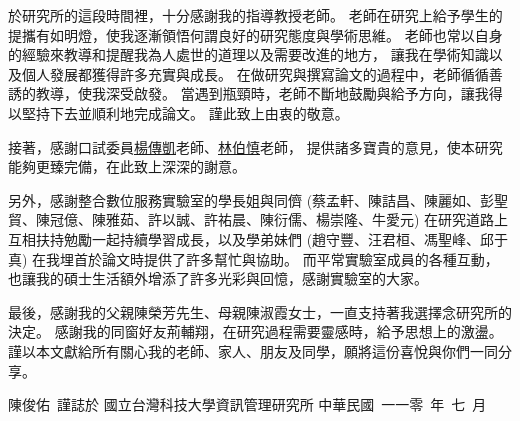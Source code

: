 
\begin{acknowledgement}

    於研究所的這段時間裡，十分感謝我的指導教授\underline{\advisor}老師。
老師在研究上給予學生的提攜有如明燈，使我逐漸領悟何謂良好的研究態度與學術思維。
老師也常以自身的經驗來教導和提醒我為人處世的道理以及需要改進的地方，
讓我在學術知識以及個人發展都獲得許多充實與成長。
在做研究與撰寫論文的過程中，老師循循善誘的教導，使我深受啟發。
當遇到瓶頸時，老師不斷地鼓勵與給予方向，讓我得以堅持下去並順利地完成論文。
謹此致上由衷的敬意。

    接著，感謝口試委員\underline{楊傳凱}老師、\underline{林伯慎}老師，
提供諸多寶貴的意見，使本研究能夠更臻完備，在此致上深深的謝意。

    另外，感謝整合數位服務實驗室的學長姐與同儕
(蔡孟軒、陳詰昌、陳麗如、彭聖貿、陳冠億、陳雅茹、許以誠、許祐晨、陳衍儒、楊崇隆、牛愛元)
在研究道路上互相扶持勉勵一起持續學習成長，以及學弟妹們
(趙守豐、汪君桓、馮聖峰、邱于真)
在我埋首於論文時提供了許多幫忙與協助。
而平常實驗室成員的各種互動，也讓我的碩士生活額外增添了許多光彩與回憶，感謝實驗室的大家。

    最後，感謝我的父親陳榮芳先生、母親陳淑霞女士，一直支持著我選擇念研究所的決定。
感謝我的同窗好友荊輔翔，在研究過程需要靈感時，給予思想上的激盪。
謹以本文獻給所有關心我的老師、家人、朋友及同學，願將這份喜悅與你們一同分享。

\mbox{}
\vfill
\mbox{}\hfill 陳俊佑~謹誌於
\newline
\mbox{}\hfill 國立台灣科技大學資訊管理研究所
\newline
\mbox{}\hfill 中華民國~一一零~年~七~月
\bigbreak

\end{acknowledgement}